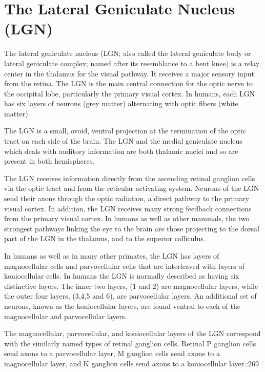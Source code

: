 \hypertarget{the-lateral-geniculate-nucleus-lgn}{%
\section{The Lateral Geniculate Nucleus (LGN)}\label{the-lateral-geniculate-nucleus-lgn}}

The lateral geniculate nucleus (LGN; also called the lateral geniculate body or lateral geniculate complex; named after its resemblance to a bent knee) is a relay center in the thalamus for the visual pathway. It receives a major sensory input from the retina. The LGN is the main central connection for the optic nerve to the occipital lobe, particularly the primary visual cortex. In humans, each LGN has six layers of neurons (grey matter) alternating with optic fibers (white matter).

The LGN is a small, ovoid, ventral projection at the termination of the optic tract on each side of the brain. The LGN and the medial geniculate nucleus which deals with auditory information are both thalamic nuclei and so are present in both hemispheres.

The LGN receives information directly from the ascending retinal ganglion cells via the optic tract and from the reticular activating system. Neurons of the LGN send their axons through the optic radiation, a direct pathway to the primary visual cortex. In addition, the LGN receives many strong feedback connections from the primary visual cortex. In humans as well as other mammals, the two strongest pathways linking the eye to the brain are those projecting to the dorsal part of the LGN in the thalamus, and to the superior colliculus.

In humans as well as in many other primates, the LGN has layers of magnocellular cells and parvocellular cells that are interleaved with layers of koniocellular cells. In humans the LGN is normally described as having six distinctive layers. The inner two layers, (1 and 2) are magnocellular layers, while the outer four layers, (3,4,5 and 6), are parvocellular layers. An additional set of neurons, known as the koniocellular layers, are found ventral to each of the magnocellular and parvocellular layers.

The magnocellular, parvocellular, and koniocellular layers of the LGN correspond with the similarly named types of retinal ganglion cells. Retinal P ganglion cells send axons to a parvocellular layer, M ganglion cells send axons to a magnocellular layer, and K ganglion cells send axons to a koniocellular layer.:269


